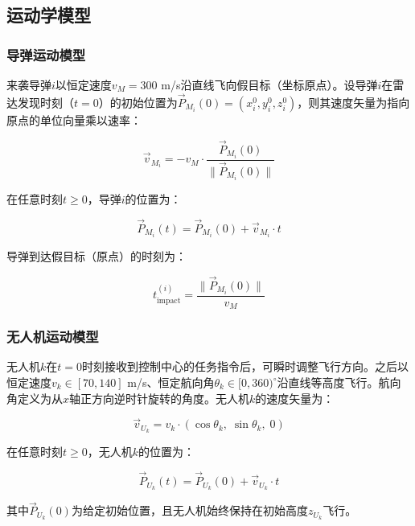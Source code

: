 
\subsection{运动学模型}

\subsubsection{导弹运动模型}

来袭导弹$i$以恒定速度$v_M = 300$ m/s沿直线飞向假目标（坐标原点）。设导弹$i$在雷达发现时刻（$t=0$）的初始位置为$\vec{P}_{M_i}(0) = (x_i^0, y_i^0, z_i^0)$，则其速度矢量为指向原点的单位向量乘以速率：

\begin{equation}
    \vec{v}_{M_i} = -v_M \cdot \frac{\vec{P}_{M_i}(0)}{\|\vec{P}_{M_i}(0)\|}
\end{equation}

在任意时刻$t \ge 0$，导弹$i$的位置为：

\begin{equation}
    \vec{P}_{M_i}(t) = \vec{P}_{M_i}(0) + \vec{v}_{M_i} \cdot t
\end{equation}

导弹到达假目标（原点）的时刻为：

\begin{equation}
    t_{\text{impact}}^{(i)} = \frac{\|\vec{P}_{M_i}(0)\|}{v_M}
\end{equation}

\subsubsection{无人机运动模型}

无人机$k$在$t=0$时刻接收到控制中心的任务指令后，可瞬时调整飞行方向。之后以恒定速度$v_k \in [70, 140]$ m/s、恒定航向角$\theta_k \in [0, 360)^\circ$沿直线等高度飞行。航向角定义为从$x$轴正方向逆时针旋转的角度。无人机$k$的速度矢量为：

\begin{equation}
    \vec{v}_{U_k} = v_k \cdot (\cos\theta_k,\; \sin\theta_k,\; 0)
\end{equation}

在任意时刻$t \ge 0$，无人机$k$的位置为：

\begin{equation}
    \vec{P}_{U_k}(t) = \vec{P}_{U_k}(0) + \vec{v}_{U_k} \cdot t
\end{equation}

其中$\vec{P}_{U_k}(0)$为给定初始位置，且无人机始终保持在初始高度$z_{U_k}$飞行。

